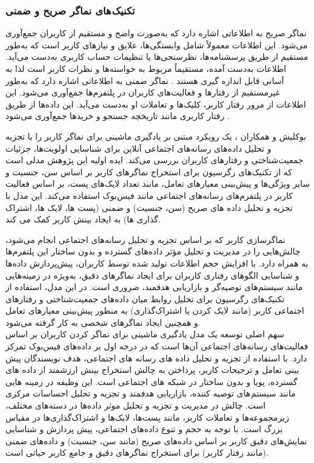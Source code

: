 \subsubsection{تکنیک های نماگر صریح و ضمنی}
نماگر صریح به اطلاعاتی اشاره دارد که به‌صورت واضح و مستقیم از کاربران جمع‌آوری می‌شود. این اطلاعات معمولاً شامل وابستگی‌ها، علایق و نیازهای کاربر است که به‌طور مستقیم از طریق پرسشنامه‌ها، نظرسنجی‌ها یا تنظیمات حساب کاربری به‌دست می‌آید. اطلاعات به‌‌دست آمده، مستقیماً مربوط به خواسته‌ها و نظرات کاربر است لذا به آسانی قابل اندازه گیری هستند %
\cite{jabeenuser}
.
\newline
نماگر ضمنی به اطلاعاتی اشاره دارد که به‌طور غیرمستقیم از رفتارها و فعالیت‌های کاربران در پلتفرم‌ها جمع‌آوری می‌شود. این اطلاعات از مرور رفتار کاربر، کلیک‌ها و تعاملات او به‌دست می‌آید. این داده‌ها از طریق رفتار کاربری مانند تاریخچه جستجو و خریدها جمع‌آوری می‌شود %
\cite{jabeenuser}
. 
\newline

بوکلیش و همکاران %
\cite{azzam2022model}
 ،
 یک رویکرد مبتنی بر یادگیری ماشینی برای نماگر کاربر را با تجزیه و تحلیل داده‌های رسانه‌های اجتماعی آنلاین برای شناسایی اولویت‌ها، جزئیات جمعیت‌شناختی و رفتارهای کاربران بررسی می‌کند. ایده اولیه این پژوهش مدلی است که از تکنیک‌های رگرسیون برای استخراج نماگر‌های کاربر بر اساس سن، جنسیت و سایر ویژگی‌ها و پیش‌بینی معیارهای تعامل، مانند تعداد لایک‌های پست، بر اساس فعالیت کاربر در پلتفرم‌های رسانه‌های اجتماعی مانند فیس‌بوک استفاده می‌کند. این مدل با تجزیه و تحلیل داده های صریح (سن، جنسیت) و ضمنی (پست ها، لایک ها، اشتراک گذاری ها) به ایجاد بینش کاربر کمک می کند.

نماگر‌سازی کاربر که بر اساس تجزیه و تحلیل رسانه‌های اجتماعی انجام می‌شود، چالش‌هایی را در مدیریت و تحلیل مؤثر داده‌های گسترده و بدون ساختار این پلتفرم‌ها به همراه دارد. با افزایش حجم اطلاعات تولید شده توسط کاربران، پیش‌پردازش داده‌ها و شناسایی الگوهای رفتاری کاربران برای ایجاد نماگر‌های دقیق، به‌ویژه در زمینه‌هایی مانند سیستم‌های توصیه‌گر و بازاریابی هدفمند، ضروری است. در این مدل، استفاده از تکنیک‌های رگرسیون برای تحلیل روابط میان داده‌های جمعیت‌شناختی و رفتارهای اجتماعی کاربر (مانند لایک کردن یا اشتراک‌گذاری) به منظور پیش‌بینی معیارهای تعامل و همچنین ایجاد نماگر‌های شخصی به کار گرفته می‌شود.\\


سهم اصلی 
\cite{azzam2022model}
 توسعه یک مدل یادگیری ماشینی برای نماگر کردن کاربران بر اساس فعالیت‌های رسانه‌های اجتماعی آن‌ها است که در درجه اول بر داده‌های فیس‌بوک تمرکز دارد. با استفاده از تجزیه و تحلیل داده های رسانه های اجتماعی، هدف نویسندگان پیش بینی تعامل و ترجیحات کاربر، پرداختن به چالش استخراج بینش ارزشمند از داده های گسترده، پویا و بدون ساختار در شبکه های اجتماعی است. این وظیفه در زمینه هایی مانند سیستم های توصیه کننده، بازاریابی هدفمند و تجزیه و تحلیل احساسات مرکزی است.
چالش در مدیریت و تجزیه و تحلیل موثر داده‌ها در دسته‌های مختلف، زیرمجموعه‌ها و تعاملات کاربر، مانند پست‌ها، لایک‌ها و اشتراک‌گذاری‌ها در مقیاس بزرگ است. با توجه به حجم و تنوع داده‌های اجتماعی، پیش پردازش و شناسایی نمایش‌های دقیق کاربر بر اساس داده‌های صریح (مانند سن، جنسیت) و داده‌های ضمنی (مانند رفتار کاربر) برای استخراج نماگر‌های دقیق و جامع کاربر حیاتی است.

